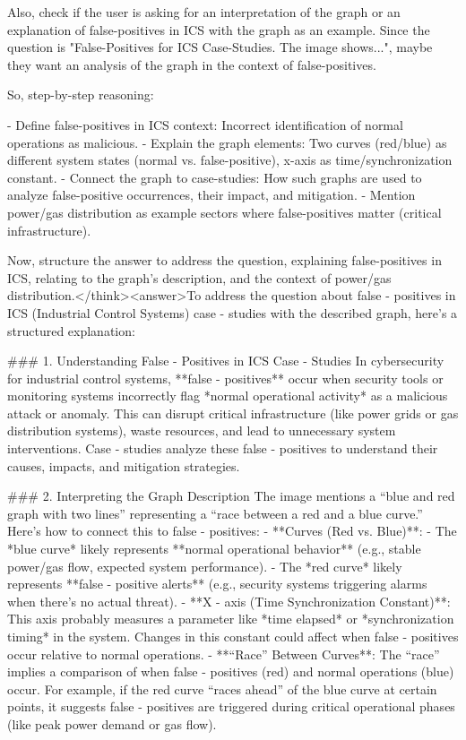 Also, check if the user is asking for an interpretation of the graph or an explanation of false-positives in ICS with the graph as an example. Since the question is "False-Positives for ICS Case-Studies. The image shows...", maybe they want an analysis of the graph in the context of false-positives.

So, step-by-step reasoning:

- Define false-positives in ICS context: Incorrect identification of normal operations as malicious.
- Explain the graph elements: Two curves (red/blue) as different system states (normal vs. false-positive), x-axis as time/synchronization constant.
- Connect the graph to case-studies: How such graphs are used to analyze false-positive occurrences, their impact, and mitigation.
- Mention power/gas distribution as example sectors where false-positives matter (critical infrastructure).

Now, structure the answer to address the question, explaining false-positives in ICS, relating to the graph's description, and the context of power/gas distribution.</think><answer>To address the question about false - positives in ICS (Industrial Control Systems) case - studies with the described graph, here’s a structured explanation:  


### 1. Understanding False - Positives in ICS Case - Studies  
In cybersecurity for industrial control systems, **false - positives** occur when security tools or monitoring systems incorrectly flag *normal operational activity* as a malicious attack or anomaly. This can disrupt critical infrastructure (like power grids or gas distribution systems), waste resources, and lead to unnecessary system interventions. Case - studies analyze these false - positives to understand their causes, impacts, and mitigation strategies.  


### 2. Interpreting the Graph Description  
The image mentions a “blue and red graph with two lines” representing a “race between a red and a blue curve.” Here’s how to connect this to false - positives:  
- **Curves (Red vs. Blue)**:  
  - The *blue curve* likely represents **normal operational behavior** (e.g., stable power/gas flow, expected system performance).  
  - The *red curve* likely represents **false - positive alerts** (e.g., security systems triggering alarms when there’s no actual threat).  
- **X - axis (Time Synchronization Constant)**:  
  This axis probably measures a parameter like *time elapsed* or *synchronization timing* in the system. Changes in this constant could affect when false - positives occur relative to normal operations.  
- **“Race” Between Curves**:  
  The “race” implies a comparison of when false - positives (red) and normal operations (blue) occur. For example, if the red curve “races ahead” of the blue curve at certain points, it suggests false - positives are triggered during critical operational phases (like peak power demand or gas flow).  



